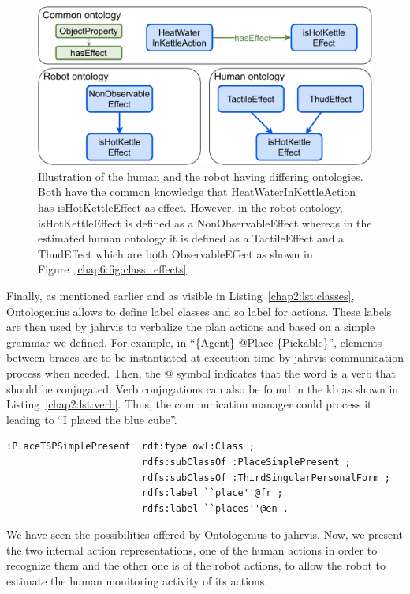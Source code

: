 \documentclass[a4paper,11pt,twoside]{StyleThese}
\begin{document}
\begin{figure}[!ht]
	\includegraphics[width=\linewidth]{figures/chapter2/kettle.pdf}
	\caption{Illustration of the human and the robot having differing ontologies. Both have the common knowledge that HeatWaterInKettleAction has isHotKettleEffect as effect. However, in the robot ontology, isHotKettleEffect is defined as a NonObservableEffect whereas in the estimated human ontology it is defined as a TactileEffect and a ThudEffect which are both ObservableEffect as shown in Figure~\ref{chap6:fig:class_effects}.}
	\label{chap6:fig:kettle}
\end{figure}

Finally, as mentioned earlier and as visible in Listing~\ref{chap2:lst:classes}, Ontologenius allows to define label classes and so label for actions. These labels are then used by \acrshort{jahrvis} to verbalize the plan actions and based on a simple grammar we defined. For example, in ``\{Agent\} @Place \{Pickable\}'', elements between braces are to be instantiated at execution time by \acrshort{jahrvis} communication process when needed. Then, the @ symbol indicates that the word is a verb that should be conjugated. Verb conjugations can also be found in the \acrshort{kb} as shown in Listing~\ref{chap2:lst:verb}. Thus, the communication manager could process it leading to ``I placed the blue cube''.

\begin{lstlisting}[style=OwlTurtle, label={chap2:lst:verb}, caption={Description of the class describing the verb Place in the third-person present-tense, in the OWL language using the Turle syntax.} ]
:PlaceTSPSimplePresent	rdf:type owl:Class ;
						rdfs:subClassOf :PlaceSimplePresent ;
						rdfs:subClassOf :ThirdSingularPersonalForm ;
						rdfs:label ``place''@fr ;
						rdfs:label ``places''@en .
\end{lstlisting}

We have seen the possibilities offered by Ontologenius to \acrshort{jahrvis}. Now, we present the two internal action representations, one of the human actions in order to recognize them and the other one is of the robot actions, to allow the robot to estimate the human monitoring activity of its actions. 
\end{document}
